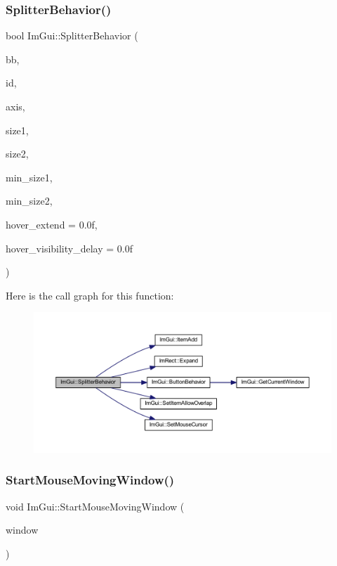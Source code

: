 \subsubsection{\texorpdfstring{Splitter\+Behavior()}{SplitterBehavior()}}
{\footnotesize\ttfamily bool Im\+Gui\+::\+Splitter\+Behavior (\begin{DoxyParamCaption}\item[{const \mbox{\hyperlink{struct_im_rect}{Im\+Rect}} \&}]{bb,  }\item[{\mbox{\hyperlink{imgui_8h_a1785c9b6f4e16406764a85f32582236f}{Im\+Gui\+ID}}}]{id,  }\item[{\mbox{\hyperlink{imgui__internal_8h_a468e54d5ed387abfbf0d1fc1e33ab483}{Im\+Gui\+Axis}}}]{axis,  }\item[{float $\ast$}]{size1,  }\item[{float $\ast$}]{size2,  }\item[{float}]{min\+\_\+size1,  }\item[{float}]{min\+\_\+size2,  }\item[{float}]{hover\+\_\+extend = {\ttfamily 0.0f},  }\item[{float}]{hover\+\_\+visibility\+\_\+delay = {\ttfamily 0.0f} }\end{DoxyParamCaption})}

Here is the call graph for this function\+:
\nopagebreak
\begin{figure}[H]
\begin{center}
\leavevmode
\includegraphics[width=350pt]{namespace_im_gui_a9d222e1384c6c56ff61b61cfa3016855_cgraph}
\end{center}
\end{figure}
\mbox{\label{namespace_im_gui_afd03199380411a711c74893434d91258}} 
\subsubsection{\texorpdfstring{Start\+Mouse\+Moving\+Window()}{StartMouseMovingWindow()}}
{\footnotesize\ttfamily void Im\+Gui\+::\+Start\+Mouse\+Moving\+Window (\begin{DoxyParamCaption}\item[{\mbox{\hyperlink{struct_im_gui_window}{Im\+Gui\+Window}} $\ast$}]{window }\end{DoxyParamCaption})}


